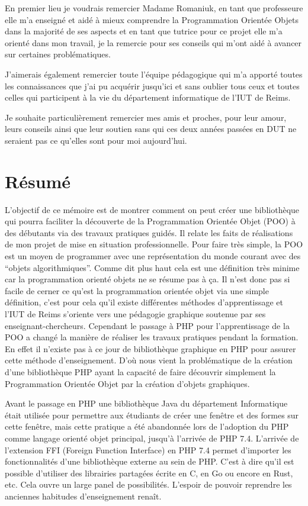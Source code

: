 \documentclass[11pt,a4paper,krantz2,11pt,oneside]{krantz}
\begin{document}
En premier lieu je voudrais remercier Madame Romaniuk, en tant que professeure elle m'a enseigné et aidé à mieux comprendre la Programmation Orientée Objets dans la majorité de ses aspects et en tant que tutrice pour ce projet elle m'a orienté dans mon travail, je la remercie pour ses conseils qui m'ont aidé à avancer sur certaines problématiques.

J'aimerais également remercier toute l'équipe pédagogique qui m'a apporté toutes les connaissances que j'ai pu acquérir jusqu'ici et sans oublier tous ceux et toutes celles qui participent à la vie du département informatique de l'IUT de Reims.

Je souhaite particulièrement remercier mes amis et proches, pour leur amour, leurs conseils ainsi que leur soutien sans qui ces deux années passées en DUT ne seraient pas ce qu'elles sont pour moi aujourd'hui.

\mainmatter

\hypertarget{ruxe9sumuxe9}{%
\chapter*{Résumé}\label{ruxe9sumuxe9}}


L'objectif de ce mémoire est de montrer comment on peut créer une bibliothèque qui pourra faciliter la découverte de la Programmation Orientée Objet (POO) à des débutants via des travaux pratiques guidés. Il relate les faits de réalisations de mon projet de mise en situation professionnelle. Pour faire très simple, la POO est un moyen de programmer avec une représentation du monde courant avec des ``objets algorithmiques''. Comme dit plus haut cela est une définition très minime car la programmation orienté objets ne se résume pas à ça. Il n'est donc pas si facile de cerner ce qu'est la programmation orientée objet via une simple définition, c'est pour cela qu'il existe différentes méthodes d'apprentissage et l'IUT de Reims s'oriente vers une pédagogie graphique soutenue par ses enseignant-chercheurs. Cependant le passage à PHP pour l'apprentissage de la POO a changé la manière de réaliser les travaux pratiques pendant la formation. En effet il n'existe pas à ce jour de bibliothèque graphique en PHP pour assurer cette méthode d'enseignement. D'où nous vient la problématique de la création d'une bibliothèque PHP ayant la capacité de faire découvrir simplement la Programmation Orientée Objet par la création d'objets graphiques.

Avant le passage en PHP une bibliothèque Java du département Informatique était utilisée pour permettre aux étudiants de créer une fenêtre et des formes sur cette fenêtre, mais cette pratique a été abandonnée lors de l'adoption du PHP comme langage orienté objet principal, jusqu'à l'arrivée de PHP 7.4. L'arrivée de l'extension FFI (Foreign Function Interface) en PHP 7.4 permet d'importer les fonctionnalités d'une bibliothèque externe au sein de PHP. C'est à dire qu'il est possible d'utiliser des librairies partagées écrite en C, en Go ou encore en Rust, etc. Cela ouvre un large panel de possibilités. L'espoir de pouvoir reprendre les anciennes habitudes d'enseignement renaît.
\end{document}

